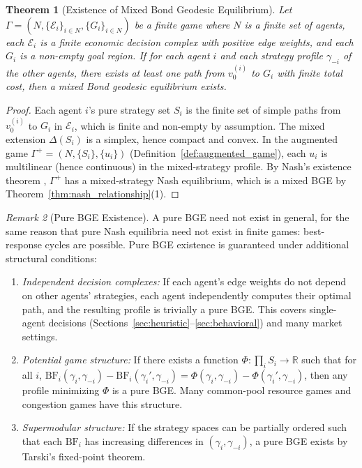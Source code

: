 \documentclass[12pt]{article}
\newtheorem{theorem}{Theorem}[section]
\theoremstyle{definition}
\theoremstyle{remark}
\newtheorem{remark}[theorem]{Remark}
\newcommand{\E}{\mathcal{E}}               %
\newcommand{\R}{\mathbb{R}}
\newcommand{\BF}{\mathrm{BF}}              %
\begin{document}
\begin{theorem}[Existence of Mixed Bond Geodesic Equilibrium]
\label{thm:bge_existence}
Let $\Gamma = (N, \{\E_i\}_{i \in N}, \{G_i\}_{i \in N})$ be a finite game where $N$ is a finite set of agents, each $\E_i$ is a finite economic decision complex with positive edge weights, and each $G_i$ is a non-empty goal region.  If for each agent $i$ and each strategy profile $\gamma_{-i}$ of the other agents, there exists at least one path from $v_0^{(i)}$ to $G_i$ with finite total cost, then a mixed Bond geodesic equilibrium exists.
\end{theorem}

\begin{proof}
Each agent $i$'s pure strategy set $S_i$ is the finite set of simple paths from $v_0^{(i)}$ to $G_i$ in $\E_i$, which is finite and non-empty by assumption.  The mixed extension $\Delta(S_i)$ is a simplex, hence compact and convex.  In the augmented game $\Gamma^+ = (N, \{S_i\}, \{u_i\})$ (Definition~\ref{def:augmented_game}), each $u_i$ is multilinear (hence continuous) in the mixed-strategy profile.  By Nash's existence theorem \cite{nash1950}, $\Gamma^+$ has a mixed-strategy Nash equilibrium, which is a mixed BGE by Theorem~\ref{thm:nash_relationship}(1).
\end{proof}

\begin{remark}[Pure BGE Existence]
\label{rem:pure_bge}
A pure BGE need not exist in general, for the same reason that pure Nash equilibria need not exist in finite games: best-response cycles are possible.  Pure BGE existence is guaranteed under additional structural conditions:
\begin{enumerate}
    \item \emph{Independent decision complexes:} If each agent's edge weights do not depend on other agents' strategies, each agent independently computes their optimal path, and the resulting profile is trivially a pure BGE.  This covers single-agent decisions (Sections~\ref{sec:heuristic}--\ref{sec:behavioral}) and many market settings.
    \item \emph{Potential game structure:} If there exists a function $\Phi: \prod_i S_i \to \R$ such that for all $i$, $\BF_i(\gamma_i, \gamma_{-i}) - \BF_i(\gamma_i', \gamma_{-i}) = \Phi(\gamma_i, \gamma_{-i}) - \Phi(\gamma_i', \gamma_{-i})$, then any profile minimizing $\Phi$ is a pure BGE.  Many common-pool resource games and congestion games have this structure.
    \item \emph{Supermodular structure:} If the strategy spaces can be partially ordered such that each $\BF_i$ has increasing differences in $(\gamma_i, \gamma_{-i})$, a pure BGE exists by Tarski's fixed-point theorem.
\end{enumerate}
\end{remark}
\end{document}
